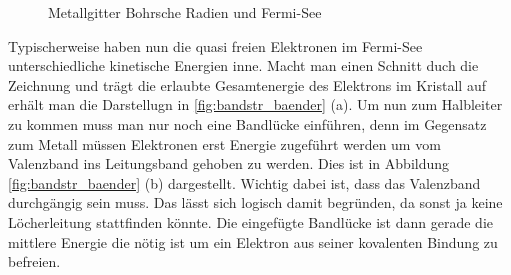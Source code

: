 \begin{figure}[H]
\begin{minipage}{.5\linewidth}
		\caption{Metallgitter Bohrsche Radien und Fermi-See} \label{fig:bandstr_metallg_b}
	\end{minipage}\par\medskip
\end{figure}

Typischerweise haben nun die quasi freien Elektronen im Fermi-See unterschiedliche kinetische Energien inne. Macht man einen Schnitt duch die Zeichnung und trägt die erlaubte Gesamtenergie des Elektrons im Kristall auf erhält man die Darstellugn in \ref{fig:bandstr_baender} (a). Um nun zum Halbleiter zu kommen muss man nur noch eine Bandlücke einführen, denn im Gegensatz zum Metall müssen Elektronen erst Energie zugeführt werden um vom Valenzband ins Leitungsband gehoben zu werden. Dies ist in Abbildung \ref{fig:bandstr_baender} (b) dargestellt. Wichtig dabei ist, dass das Valenzband durchgängig sein muss. Das lässt sich logisch damit begründen, da sonst ja keine Löcherleitung stattfinden könnte. Die eingefügte Bandlücke ist dann gerade die mittlere Energie die nötig ist um ein Elektron aus seiner kovalenten Bindung zu befreien.

